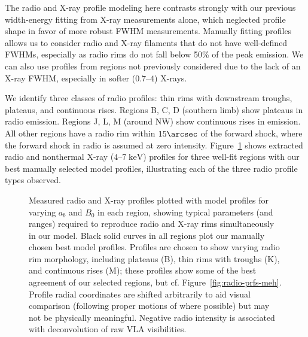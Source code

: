 \documentclass[manuscript]{aastex}  %
\newcommand*{\mt}{\mathrm}
\newcommand*{\unit}[1]{\;\mt{#1}}  %
\begin{document}
The radio and X-ray profile modeling here contrasts strongly with our previous
width-energy fitting from X-ray measurements alone, which neglected profile
shape in favor of more robust FWHM measurements.  Manually fitting profiles
allows us to consider radio and X-ray filaments that do not have well-defined
FWHMs, especially as radio rims do not fall below 50\% of the peak emission.
We can also use profiles from regions not previously considered due to the lack
of an X-ray FWHM, especially in softer ($0.7$--$4$) X-rays.

We identify three classes of radio profiles: thin rims with downstream troughs,
plateaus, and continuous rises.  Regions B, C, D (southern limb) show plateaus
in radio emission.  Regions J, L, M (around NW) show continuous rises in
emission.  All other regions have a radio rim within $15\arcsec$ of the forward
shock, where the forward shock in radio is assumed at zero intensity.
Figure~\ref{fig:radio-prfs} shows extracted radio and nonthermal X-ray
($4$--$7\unit{keV}$) profiles for three well-fit regions with our best manually
selected model profiles, illustrating each of the three radio profile types
observed.

\begin{figure}
    \centering
    \iftoggle{manuscript}{
        \epsscale{0.6}
        \plotone{figures/radio-fits-B.pdf} \\
        \plotone{figures/radio-fits-K.pdf} \\
        \plotone{figures/radio-fits-M.pdf}
        \epsscale{1}
    }{
        \texttt{[image: figures/radio-fits-B.pdf]} \\
        \texttt{[image: figures/radio-fits-K.pdf]} \\
        \texttt{[image: figures/radio-fits-M.pdf]}
    }
    \caption{Measured radio and X-ray profiles plotted with model profiles for
    varying $a_b$ and $B_0$ in each region, showing typical parameters (and
    ranges) required to reproduce radio and X-ray rims simultaneously in our
    model.  Black solid curves in all regions plot our manually chosen best
    model profiles.  Profiles are chosen to show varying radio rim morphology,
    including plateaus (B), thin rims with troughs (K), and continuous rises
    (M); these profiles show some of the best agreement of our selected
    regions, but cf. Figure~\ref{fig:radio-prfs-meh}.  Profile radial
    coordinates are shifted arbitrarily to aid visual comparison (following
    proper motions of \citet{katsuda2010-tycho} where possible) but may not be
    physically meaningful.  Negative radio intensity is associated with
    deconvolution of raw VLA visibilities.
    \label{fig:radio-prfs}}
\end{figure}
\end{document}
